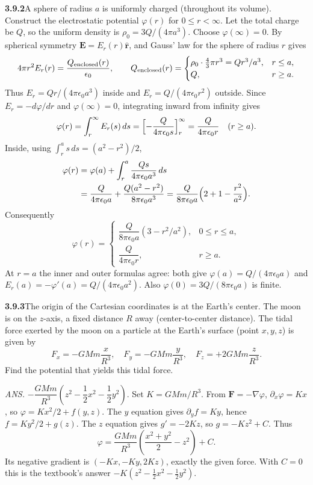 \par\bigskip
\noindent\textbf{3.9.2}\quad A sphere of radius $a$ is uniformly charged
(throughout its volume). Construct the electrostatic potential $\varphi(r)$
for $0\le r<\infty$.
\solution
Let the total charge be $Q$, so the uniform density is
$\rho_0=3Q/(4\pi a^3)$. Choose $\varphi(\infty)=0$.
By spherical symmetry $\mathbf E=E_r(r)\hat{\mathbf r}$, and Gauss' law
for the sphere of radius $r$ gives
\[
4\pi r^2 E_r(r)=\frac{Q_{\rm enclosed}(r)}{\epsilon_0},\qquad
Q_{\rm enclosed}(r)=
\begin{cases}\rho_0\cdot\frac43\pi r^3=Q r^3/a^3,&r\le a,\\
Q,&r\ge a.\end{cases}
\]
Thus $E_r=Qr/(4\pi\epsilon_0a^3)$ inside and
$E_r=Q/(4\pi\epsilon_0r^2)$ outside.
Since $E_r=-d\varphi/dr$ and $\varphi(\infty)=0$, integrating inward
from infinity gives
\[
\varphi(r)=\int_r^\infty E_r(s)\,ds
=\Bigl[-\frac{Q}{4\pi\epsilon_0s}\Bigr]_r^\infty
=\frac{Q}{4\pi\epsilon_0r}\quad(r\ge a).
\]
Inside, using $\int_r^as\,ds=(a^2-r^2)/2$,
\[
\begin{aligned}
\varphi(r)&=\varphi(a)+\int_r^a\frac{Qs}{4\pi\epsilon_0a^3}\,ds\\
&=\frac{Q}{4\pi\epsilon_0a}
+\frac{Q(a^2-r^2)}{8\pi\epsilon_0a^3}
=\frac{Q}{8\pi\epsilon_0a}\Bigl(2+1-\frac{r^2}{a^2}\Bigr).
\end{aligned}
\]
Consequently
\[
\boxed{\varphi(r)=
\begin{cases}
\dfrac{Q}{8\pi\epsilon_0a}(3-r^2/a^2),&0\le r\le a,\\[3pt]
\dfrac{Q}{4\pi\epsilon_0r},&r\ge a.
\end{cases}}
\]
At $r=a$ the inner and outer formulas agree: both give
$\varphi(a)=Q/(4\pi\epsilon_0a)$ and
$E_r(a)=-\varphi'(a)=Q/(4\pi\epsilon_0a^2)$. Also
$\varphi(0)=3Q/(8\pi\epsilon_0a)$ is finite.

\par\bigskip
\noindent\textbf{3.9.3}\quad The origin of the Cartesian coordinates is at the
Earth's center. The moon is on the $z$-axis, a fixed distance $R$ away
(center-to-center distance). The tidal force exerted by the moon on a particle
at the Earth's surface (point $x,y,z$) is given by
\[
F_{x}=-GMm\frac{x}{R^{3}},\quad F_{y}=-GMm\frac{y}{R^{3}},\quad
F_{z}=+2GMm\frac{z}{R^{3}}.
\]
Find the potential that yields this tidal force.
\par\nobreak\hfill\emph{ANS.}\enspace
$-\dfrac{GMm}{R^{3}}\left(z^{2}-\dfrac{1}{2}x^{2}-\dfrac{1}{2}y^{2}\right)$.
\solution
Set $K=GMm/R^3$. From $\mathbf F=-\nabla\varphi$,
$\partial_x\varphi=Kx$, so
$\varphi=Kx^2/2+f(y,z)$.
The $y$ equation gives $\partial_yf=Ky$, hence
$f=Ky^2/2+g(z)$. The $z$ equation gives $g'=-2Kz$, so
$g=-Kz^2+C$. Thus
\[
\boxed{\varphi=\frac{GMm}{R^3}
\left(\frac{x^2+y^2}{2}-z^2\right)+C}.
\]
Its negative gradient is $(-Kx,-Ky,2Kz)$, exactly the given force.
With $C=0$ this is the textbook's answer
$-K(z^2-\frac12x^2-\frac12y^2)$.

